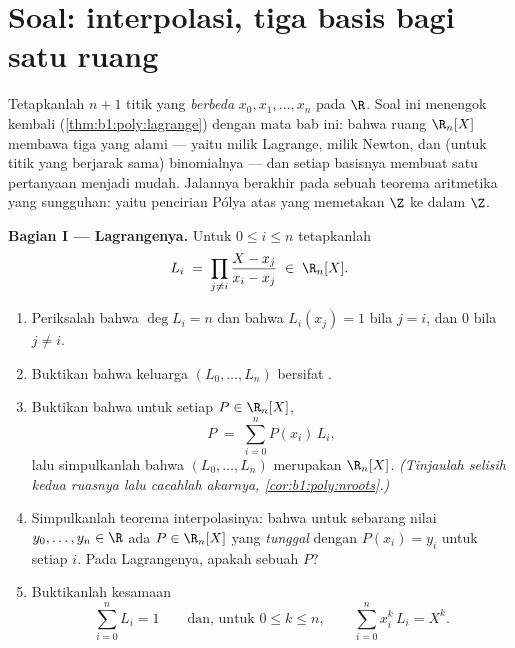 \section{Soal: interpolasi, tiga basis bagi satu ruang}

\begin{problem}\label{pb:b1:vspaces:1}
Tetapkanlah $n + 1$ titik yang \emph{berbeda} $x_0, x_1, \dots, x_n$ pada $\R$.
Soal ini menengok kembali 
(\cref{thm:b1:poly:lagrange}) dengan mata bab ini: bahwa
ruang $\R_n[X]$ membawa tiga  yang alami --- yaitu milik Lagrange,
milik Newton, dan (untuk titik yang berjarak sama)  binomialnya ---
dan setiap basisnya membuat satu pertanyaan menjadi mudah. Jalannya berakhir pada sebuah teorema
aritmetika yang sungguhan: yaitu pencirian Pólya atas 
yang memetakan $\Z$ ke dalam $\Z$.

\medskip
\noindent\textbf{Bagian I ---  Lagrangenya.} Untuk $0 \leq i
\leq n$ tetapkanlah
\[
L_i \;=\; \prod_{j \neq i} \frac{X - x_j}{x_i - x_j} \;\in\;
\R_n[X].
\]
\begin{enumerate}
  \item Periksalah bahwa $\deg L_i = n$ dan bahwa $L_i(x_j) = 1$ bila $j =
        i$, dan $0$ bila $j \neq i$.
  \item Buktikan bahwa keluarga $(L_0, \dots, L_n)$ bersifat .
  \item Buktikan bahwa untuk setiap $P \in \R_n[X]$,
        \[
        P \;=\; \sum_{i=0}^{n} P(x_i)\, L_i ,
        \]
        lalu simpulkanlah bahwa $(L_0, \dots, L_n)$ merupakan 
        $\R_n[X]$. \emph{(Tinjaulah selisih kedua ruasnya
        lalu cacahlah akarnya, \cref{cor:b1:poly:nroots}.)}
  \item Simpulkanlah teorema interpolasinya: bahwa untuk sebarang nilai $y_0,
        \dots, y_n \in \R$ ada $P \in
        \R_n[X]$ yang \emph{tunggal} dengan $P(x_i) = y_i$ untuk setiap $i$. Pada 
        Lagrangenya, apakah  sebuah  $P$?
  \item Buktikanlah kesamaan
        \[
        \sum_{i=0}^{n} L_i = 1
        \qquad\text{dan, untuk } 0 \leq k \leq n,\qquad
        \sum_{i=0}^{n} x_i^{k}\, L_i = X^{k} .
        \]
\end{enumerate}


\end{problem}
